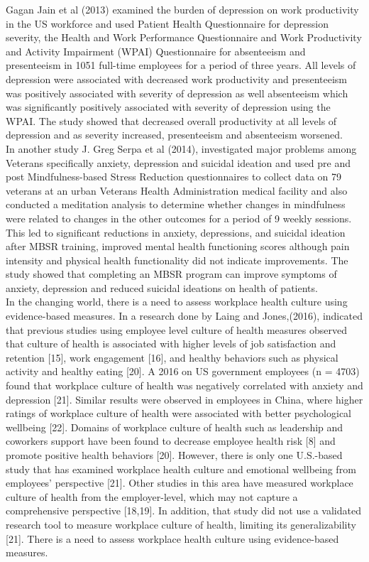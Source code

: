 \documentclass[12pt]{article}
\begin{document}
Gagan Jain et al (2013) examined the burden of depression on work productivity in the US workforce and used Patient Health Questionnaire for depression severity, the Health and Work Performance Questionnaire and Work Productivity and Activity Impairment (WPAI) Questionnaire for absenteeism and presenteeism in 1051 full-time employees for a period of three years. All levels of depression were associated with decreased work productivity and presenteeism was positively associated with severity of depression as well absenteeism which was significantly positively associated with severity of depression using the WPAI. The study showed that decreased overall productivity at all levels of depression and as severity increased, presenteeism and absenteeism worsened. \\

In another study J. Greg Serpa et al (2014), investigated major problems among Veterans specifically anxiety, depression and suicidal ideation and used pre and post Mindfulness-based Stress Reduction questionnaires to collect data on 79 veterans at an urban Veterans Health Administration medical facility and also conducted a meditation analysis to determine whether changes in mindfulness were related to changes in the other outcomes for a period of 9 weekly sessions. This led to significant reductions in anxiety, depressions, and suicidal ideation after MBSR training, improved mental health functioning scores although pain intensity and physical health functionality did not indicate improvements. The study showed that completing an MBSR program can improve symptoms of anxiety, depression and reduced suicidal ideations on health of patients. \\

In the changing world, there is a need to assess workplace health culture using evidence-based measures. In a research done by Laing and Jones,(2016), indicated that previous studies using employee level culture of health measures observed that culture of health is associated with higher levels of job satisfaction and retention [15], work engagement [16], and healthy behaviors such as physical activity and healthy eating [20]. A 2016 on US government employees (n = 4703) found that workplace culture of health was negatively correlated with anxiety and depression [21]. Similar results were observed in employees in China, where higher ratings of workplace culture of health were associated with better psychological wellbeing [22]. 
Domains of workplace culture of health such as leadership and coworkers support have been found to decrease employee health risk [8] and promote positive health behaviors [20]. However, there is only one U.S.-based study that has examined workplace health culture and emotional wellbeing from employees' perspective [21].  Other studies in this area have measured workplace culture of health from the employer-level, which may not capture a comprehensive perspective [18,19]. In addition, that study did not use a validated research tool to measure workplace culture of health, limiting its generalizability [21]. There is a need to assess workplace health culture using evidence-based measures. 
\end{document}
